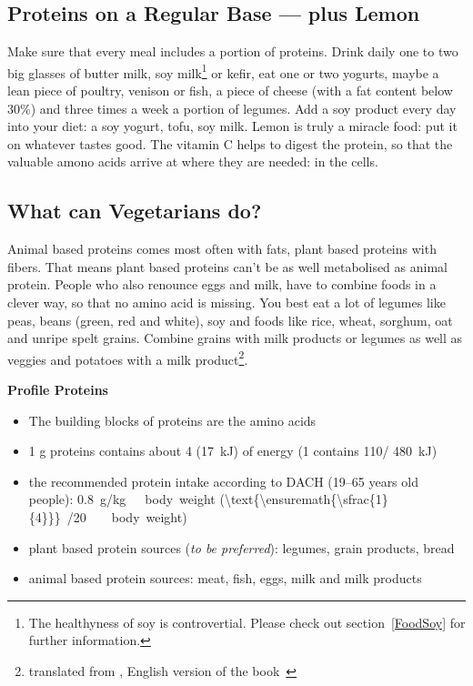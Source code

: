 \documentclass[../main.tex]{subfiles}
\begin{document}
      \subsection{Proteins on a Regular Base --- plus Lemon}

      Make sure that every meal includes a portion of proteins.
      Drink daily one to two big glasses of butter milk,
      soy milk\footnote{The healthyness of soy is controvertial. Please check out section~\ref{FoodSoy} for further information.}
      or kefir, eat one or two yogurts, maybe a lean piece of poultry, venison or fish,
      a piece of cheese (with a fat content below 30\%) and three times a week a portion of legumes.
      Add a soy product every day into your diet: a soy yogurt, tofu, soy milk.
      Lemon is truly a miracle food: put it on whatever tastes good.
      The vitamin C helps to digest the protein, so that the valuable amono acids arrive at where they are needed: in the cells.

      \subsection{What can Vegetarians do?}

      Animal based proteins comes most often with fats, plant based proteins with fibers.
      That means plant based proteins can't be as well metabolised as animal protein.
      People who also renounce eggs and milk, have to combine foods in a clever way, so that no amino acid is missing.
      You best eat a lot of legumes like peas, beans (green, red and white), soy and foods like rice, wheat, sorghum, oat and unripe spelt grains.
      Combine grains with milk products or legumes as well as veggies and potatoes with a
      milk product\footnote{translated from \cite{GLYX}, English version of the book~\cite{GLYX-En}}.

      
\vspace{5mm}
\noindent
\begin{fminipage}{\textwidth}
  \textbf{Profile Proteins}
  \begin{itemize}
  \item The building blocks of proteins are the amino acids
  \item 1 g proteins contains about \SI{4}{\kcal} (\SI{17}{\kJ}) of energy
    (\SI{1}{\oz} contains \SI{110}{\kcal}/ \SI{480}{\kJ})
  \item the recommended protein intake according to DACH (19--65 years old people): \SI{0.8}{\g/\kg\ body weight}
    (\SI[parse-numbers=false]{\text{\ensuremath{\sfrac{1}{4}}}}{\oz/20\lbs\ body weight})
  \item plant based protein sources (\emph{to be preferred}): legumes, grain products, bread
    \item animal based protein sources: meat, fish, eggs, milk and milk products
  \end{itemize}
\end{fminipage}
\end{document}
